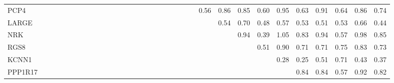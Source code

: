\begin{longtable}{lrrrrrrrrrrrrrrrrrrrrrrrrrrrrrrrr}
PCP4     &            &                &                &              &              &             &             &             &             &            &              &             &           &             &              &             &             &              &              &               &            &            &        0.56 &      0.86 &       0.85 &        0.60 &          0.95 &        0.63 &        0.91 &         0.64 &         0.86 &        0.74 \\
LARGE    &            &                &                &              &              &             &             &             &             &            &              &             &           &             &              &             &             &              &              &               &            &            &             &      0.54 &       0.70 &        0.48 &          0.57 &        0.53 &        0.51 &         0.53 &         0.66 &        0.44 \\
NRK      &            &                &                &              &              &             &             &             &             &            &              &             &           &             &              &             &             &              &              &               &            &            &             &           &       0.94 &        0.39 &          1.05 &        0.83 &        0.94 &         0.57 &         0.98 &        0.85 \\
RGS8     &            &                &                &              &              &             &             &             &             &            &              &             &           &             &              &             &             &              &              &               &            &            &             &           &            &        0.51 &          0.90 &        0.71 &        0.71 &         0.75 &         0.83 &        0.73 \\
KCNN1    &            &                &                &              &              &             &             &             &             &            &              &             &           &             &              &             &             &              &              &               &            &            &             &           &            &             &          0.28 &        0.25 &        0.51 &         0.71 &         0.43 &        0.37 \\
PPP1R17  &            &                &                &              &              &             &             &             &             &            &              &             &           &             &              &             &             &              &              &               &            &            &             &           &            &             &               &        0.84 &        0.84 &         0.57 &         0.92 &        0.82 \\

\end{longtable}

